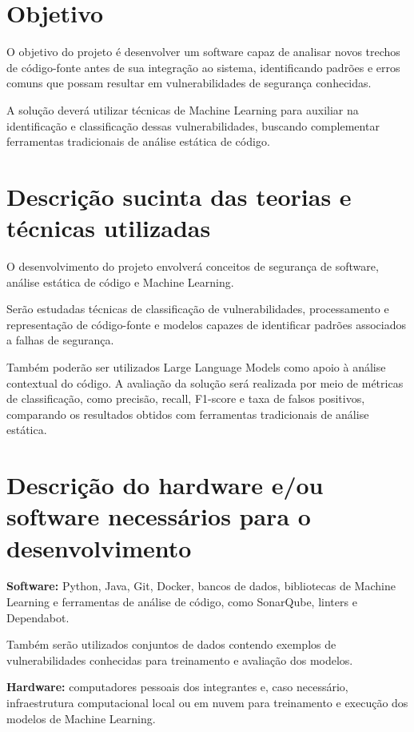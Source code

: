 \documentclass[12pt,a4paper]{article}
\begin{document}
\section{Objetivo}

O objetivo do projeto é desenvolver um software capaz de analisar novos
trechos de código-fonte antes de sua integração ao sistema, identificando
padrões e erros comuns que possam resultar em vulnerabilidades de
segurança conhecidas.

A solução deverá utilizar técnicas de Machine Learning para auxiliar
na identificação e classificação dessas vulnerabilidades, buscando
complementar ferramentas tradicionais de análise estática de código.

\section{Descrição sucinta das teorias e técnicas utilizadas}

O desenvolvimento do projeto envolverá conceitos de segurança de
software, análise estática de código e Machine Learning.

Serão estudadas técnicas de classificação de vulnerabilidades,
processamento e representação de código-fonte e modelos capazes de
identificar padrões associados a falhas de segurança.

Também poderão ser utilizados Large Language Models como apoio à
análise contextual do código. A avaliação da solução será realizada
por meio de métricas de classificação, como precisão, recall,
F1-score e taxa de falsos positivos, comparando os resultados obtidos
com ferramentas tradicionais de análise estática.

\section{Descrição do hardware e/ou software necessários para o desenvolvimento}

\textbf{Software:}
Python, Java, Git, Docker, bancos de dados, bibliotecas de Machine
Learning e ferramentas de análise de código, como SonarQube,
linters e Dependabot.

Também serão utilizados conjuntos de dados contendo exemplos de
vulnerabilidades conhecidas para treinamento e avaliação dos modelos.

\textbf{Hardware:}
computadores pessoais dos integrantes e, caso necessário,
infraestrutura computacional local ou em nuvem para treinamento e
execução dos modelos de Machine Learning.
\end{document}
